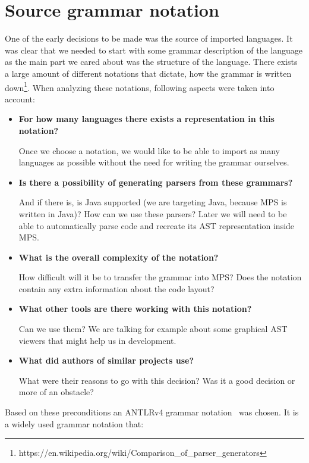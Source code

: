 \chapter{Source grammar notation}
\label{chap:source_grammar_notation}

One of the early decisions to be made was the source of imported languages.
It was clear that we needed to start with some grammar description of the language as the main part we cared about was the structure of the language.
There exists a large amount of different notations that dictate, how the grammar is written down\footnote{https://en.wikipedia.org/wiki/Comparison{\_}of{\_}parser{\_}generators}.
When analyzing these notations, following aspects were taken into account:

\begin{itemize}
	\item \textbf{For how many languages there exists a representation in this notation?}

	Once we choose a notation, we would like to be able to import as many languages as possible without the need for writing the grammar ourselves.

	\item \textbf{Is there a possibility of generating parsers from these grammars?}

	And if there is, is Java supported (we are targeting Java, because MPS is written in Java)? How can we use these parsers? Later we will need to be able to automatically parse code and recreate its AST representation inside MPS.

	\item \textbf{What is the overall complexity of the notation?}

	How difficult will it be to transfer the grammar into MPS? Does the notation contain any extra information about the code layout?

	\item \textbf{What other tools are there working with this notation?}

	Can we use them? We are talking for example about some graphical AST viewers that might help us in development.

	\item \textbf{What did authors of similar projects use?}

	What were their reasons to go with this decision? Was it a good decision or more of an obstacle?
\end{itemize}

Based on these preconditions an ANTLRv4 grammar notation~\cite{ANTLR4reference} was chosen.
It is a widely used grammar notation that:


